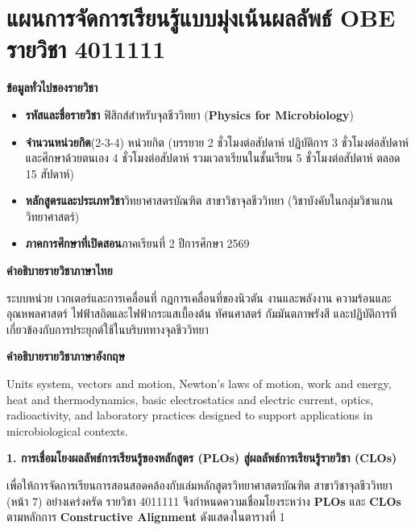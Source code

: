\chapter*{แผนการจัดการเรียนรู้แบบมุ่งเน้นผลลัพธ์ OBE รายวิชา 4011111}

\noindent\textbf{ข้อมูลทั่วไปของรายวิชา}
\begin{itemize}
    \item \textbf{รหัสและชื่อรายวิชา} ฟิสิกส์สำหรับจุลชีววิทยา (\textbf{Physics for Microbiology})
    \item \textbf{จำนวนหน่วยกิต}(2-3-4) หน่วยกิต (บรรยาย 2 ชั่วโมงต่อสัปดาห์ ปฏิบัติการ 3 ชั่วโมงต่อสัปดาห์ และศึกษาด้วยตนเอง 4 ชั่วโมงต่อสัปดาห์ รวมเวลาเรียนในชั้นเรียน 5 ชั่วโมงต่อสัปดาห์ ตลอด 15 สัปดาห์)
    \item \textbf{หลักสูตรและประเภทวิชา}\quad วิทยาศาสตรบัณฑิต สาขาวิชาจุลชีววิทยา (วิชาบังคับในกลุ่มวิชาแกนวิทยาศาสตร์)
    \item \textbf{ภาคการศึกษาที่เปิดสอน}\quad ภาคเรียนที่ 2 ปีการศึกษา 2569
\end{itemize}

\noindent\textbf{คำอธิบายรายวิชาภาษาไทย}

ระบบหน่วย เวกเตอร์และการเคลื่อนที่ กฎการเคลื่อนที่ของนิวตัน งานและพลังงาน ความร้อนและอุณหพลศาสตร์ ไฟฟ้าสถิตและไฟฟ้ากระแสเบื้องต้น ทัศนศาสตร์ กัมมันตภาพรังสี และปฏิบัติการที่เกี่ยวข้องกับการประยุกต์ใช้ในบริบททางจุลชีววิทยา

\noindent\textbf{คำอธิบายรายวิชาภาษาอังกฤษ}

Units system, vectors and motion, Newton's laws of motion, work and energy, heat and thermodynamics, basic electrostatics and electric current, optics, radioactivity, and laboratory practices designed to support applications in microbiological contexts.

\vspace{0.3cm}
\noindent\textbf{1. การเชื่อมโยงผลลัพธ์การเรียนรู้ของหลักสูตร (PLOs) สู่ผลลัพธ์การเรียนรู้รายวิชา (CLOs)}

เพื่อให้การจัดการเรียนการสอนสอดคล้องกับเล่มหลักสูตรวิทยาศาสตรบัณฑิต สาขาวิชาจุลชีววิทยา (หน้า 7) อย่างเคร่งครัด รายวิชา 4011111 จึงกำหนดความเชื่อมโยงระหว่าง \textbf{PLOs} และ \textbf{CLOs} ตามหลักการ \textbf{Constructive Alignment} ดังแสดงใน\mbox{ตารางที่} 1

